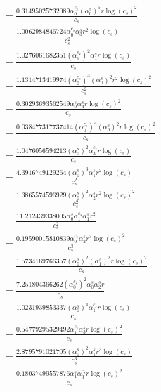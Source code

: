 \documentclass[10pt]{article}
\begin{document}
\begin{align*}
&{}  - \frac{0.31495025732089 \alpha_{0}^{c_s} \left(\alpha_{0}^s\right)^{5} r \log{\left(c_{s} \right)}^{2}}{c_{s}} \\
&{}  - \frac{1.0062984846724 \alpha_{0}^{c_s} \alpha_{3}^s r^{2} \log{\left(c_{s} \right)}}{c_{s}^{2}} \\
&{}  - \frac{1.0276061682351 \left(\alpha_{1}^{c_s}\right)^{2} \alpha_{1}^s r \log{\left(c_{s} \right)}}{c_{s}} \\
&{}  - \frac{1.1314713419974 \left(\alpha_{0}^{c_s}\right)^{3} \left(\alpha_{0}^s\right)^{2} r^{2} \log{\left(c_{s} \right)}^{2}}{c_{s}^{2}} \\
&{}  - \frac{0.30293693562549 \alpha_{0}^s \alpha_{4}^s r \log{\left(c_{s} \right)}^{2}}{c_{s}} \\
&{}  - \frac{0.038477317737414 \left(\alpha_{0}^{c_s}\right)^{4} \left(\alpha_{0}^s\right)^{2} r \log{\left(c_{s} \right)}^{2}}{c_{s}} \\
&{}  - \frac{1.0476056594213 \left(\alpha_{0}^s\right)^{2} \alpha_{3}^{c_s} r \log{\left(c_{s} \right)}}{c_{s}} \\
&{}  - \frac{4.3916749129264 \left(\alpha_{0}^s\right)^{3} \alpha_{1}^s r^{2} \log{\left(c_{s} \right)}}{c_{s}^{2}} \\
&{}  - \frac{1.3865574596929 \left(\alpha_{0}^s\right)^{2} \alpha_{2}^s r^{2} \log{\left(c_{s} \right)}^{2}}{c_{s}^{2}} \\
&{}  - \frac{11.212439338005 \alpha_{0}^s \alpha_{1}^{c_s} \alpha_{1}^s r^{2}}{c_{s}^{2}} \\
&{}  - \frac{0.19590015810839 \alpha_{0}^{c_s} \alpha_{2}^s r^{3} \log{\left(c_{s} \right)}^{2}}{c_{s}^{3}} \\
&{}  - \frac{1.5734169766357 \left(\alpha_{0}^s\right)^{2} \left(\alpha_{1}^s\right)^{2} r \log{\left(c_{s} \right)}^{2}}{c_{s}} \\
&{}  - \frac{7.251804366262 \left(\alpha_{0}^{c_s}\right)^{2} \alpha_{0}^s \alpha_{2}^s r}{c_{s}} \\
&{}  - \frac{1.0231939853337 \left(\alpha_{0}^s\right)^{4} \alpha_{1}^{c_s} r \log{\left(c_{s} \right)}}{c_{s}} \\
&{}  - \frac{0.54779295329492 \alpha_{1}^{c_s} \alpha_{3}^s r \log{\left(c_{s} \right)}^{2}}{c_{s}} \\
&{}  - \frac{2.8795791021705 \left(\alpha_{0}^s\right)^{2} \alpha_{1}^s r^{3} \log{\left(c_{s} \right)}}{c_{s}^{3}} \\
&{}  - \frac{0.18037499557876 \alpha_{1}^s \alpha_{3}^{c_s} r \log{\left(c_{s} \right)}^{2}}{c_{s}} \\

\end{align*}
\end{document}
